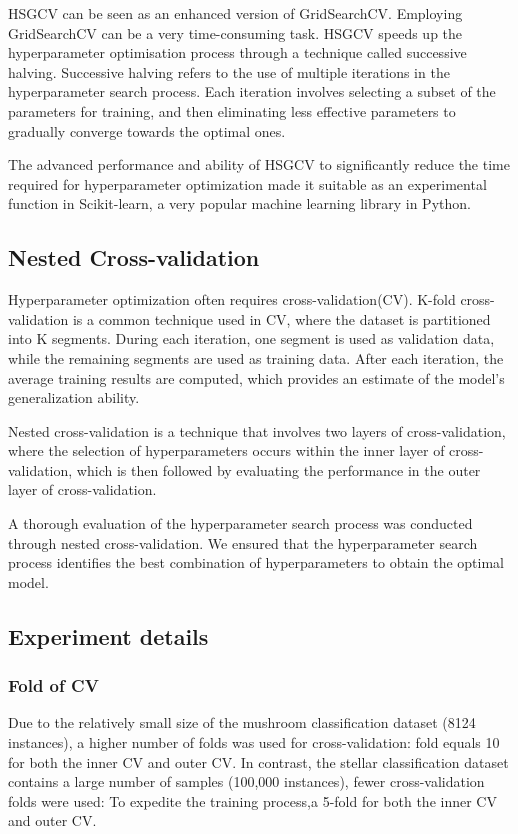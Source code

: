 \documentclass[runningheads,a4paper]{llncs}
\begin{document}
HSGCV can be seen as an enhanced version of GridSearchCV. Employing GridSearchCV can be a very time-consuming task. HSGCV speeds up the hyperparameter optimisation process through a technique called successive halving\cite{pmlr-v51-jamieson16}.
Successive halving refers to the use of multiple iterations in the hyperparameter search process. Each iteration involves selecting a subset of the parameters for training, and then eliminating less effective parameters to gradually converge towards the optimal ones.

The advanced performance and ability of HSGCV to significantly reduce the time required for hyperparameter optimization made it suitable as an experimental function in Scikit-learn\cite{pedregosa2011scikit}, a very popular machine learning library in Python.

\subsection{Nested Cross-validation}
Hyperparameter optimization often requires cross-validation(CV). K-fold cross-validation is a common technique used in CV, where the dataset is partitioned into K segments. During each iteration, one segment is used as validation data, while the remaining segments are used as training data. After each iteration, the average training results are computed, which provides an estimate of the model's generalization ability.

Nested cross-validation\cite{https://doi.org/10.1111/j.2517-6161.1974.tb00994.x} is a technique that involves two layers of cross-validation, where the selection of hyperparameters occurs within the inner layer of cross-validation, which is then followed by evaluating the performance in the outer layer of cross-validation.

A thorough evaluation of the hyperparameter search process was conducted through nested cross-validation. We ensured that the hyperparameter search process identifies the best combination of hyperparameters to obtain the optimal model.

\subsection{Experiment details}

\subsubsection{Fold of CV}
Due to the relatively small size of the mushroom classification dataset (8124 instances), a higher number of folds was used for cross-validation: fold equals 10  for both the inner CV and outer CV. In contrast, the stellar classification dataset contains a large number of samples (100,000 instances), fewer cross-validation folds were used: To expedite the training process,a 5-fold for both the inner CV and outer CV.
\end{document}
